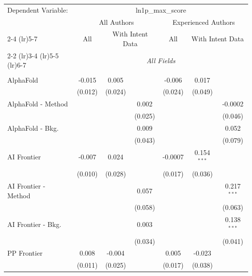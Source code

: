 \begingroup
\centering
\begin{tabular}{lcccccc}
   \tabularnewline \midrule \midrule
   Dependent Variable: & \multicolumn{6}{c}{ln1p\_max\_score}\\
 & \multicolumn{3}{c}{All Authors} & \multicolumn{3}{c}{Experienced Authors} \\
\cmidrule(lr){2-4} \cmidrule(lr){5-7}
 & \multicolumn{1}{c}{All} & \multicolumn{2}{c}{With Intent Data} & \multicolumn{1}{c}{All} & \multicolumn{2}{c}{With Intent Data} \\
\cmidrule(lr){2-2} \cmidrule(lr){3-4} \cmidrule(lr){5-5} \cmidrule(lr){6-7}
 & \multicolumn{6}{c}{\textit{All Fields}} \\ \\
   AlphaFold            & -0.015  & 0.005   &         & -0.006  & 0.017         &   \\   
                        & (0.012) & (0.024) &         & (0.024) & (0.049)       &   \\   
   AlphaFold - Method   &         &         & 0.002   &         &               & -0.0002\\   
                        &         &         & (0.025) &         &               & (0.046)\\   
   AlphaFold - Bkg.     &         &         & 0.009   &         &               & 0.052\\   
                        &         &         & (0.043) &         &               & (0.079)\\   
   AI Frontier          & -0.007  & 0.024   &         & -0.0007 & 0.154$^{***}$ &   \\   
                        & (0.010) & (0.028) &         & (0.017) & (0.036)       &   \\   
   AI Frontier - Method &         &         & 0.057   &         &               & 0.217$^{***}$\\   
                        &         &         & (0.058) &         &               & (0.063)\\   
   AI Frontier - Bkg.   &         &         & 0.003   &         &               & 0.138$^{***}$\\   
                        &         &         & (0.034) &         &               & (0.041)\\   
   PP Frontier          & 0.008   & -0.004  &         & 0.005   & -0.023        &   \\   
                        & (0.011) & (0.025) &         & (0.017) & (0.038)       &   \\   

\end{tabular}
